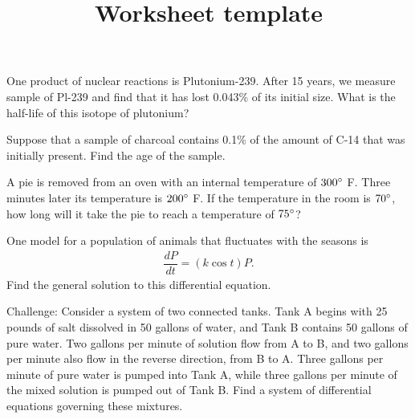 \documentclass[12pt]{exam}
\title{Worksheet template}
\begin{document}
\bigskip

             
\begin{questions}

\question
One product of nuclear reactions is Plutonium-239.  After 15 years, we measure sample of Pl-239 and find that it has lost 0.043\% of its initial size.  What is the half-life of this isotope of plutonium?

\question
Suppose that a sample of charcoal contains 0.1\% of the amount of C-14 that was initially present.  Find the age of the sample.

\question
A pie is removed from an oven with an internal temperature of $300\degree$ F.  Three minutes later its temperature is $200\degree$ F.  If the temperature in the room is $70 \degree$, how long will it take the pie to reach a temperature of $75\degree$?

\question
One model for a population of animals that fluctuates with the seasons is
\begin{align*}
	\dfrac{dP}{dt} = \left( k \cos t \right) P.
\end{align*}
Find the general solution to this differential equation.

\question
Challenge: Consider a system of two connected tanks.  Tank A begins with 25 pounds of salt dissolved in 50 gallons of water, and Tank B contains 50 gallons of pure water.  Two gallons per minute of solution flow from A to B, and two gallons per minute also flow in the reverse direction, from B to A.  Three gallons per minute of pure water is pumped into Tank A, while three gallons per minute of the mixed solution is pumped out of Tank B.  Find a system of differential equations governing these mixtures.

\end{questions}
\end{document}
